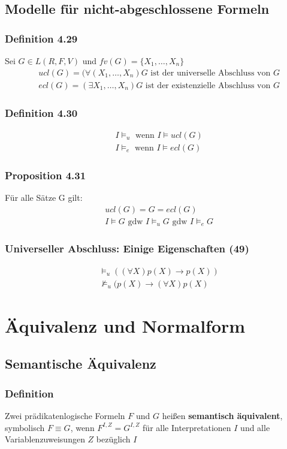 \subsection{Modelle für nicht-abgeschlossene Formeln}
\subsubsection{Definition 4.29}
Sei \(G \in L(R,F,V) \) und \(fv(G) = \{X_{1}, \ldots , X_{n}\}\)
\begin{align*}
& ucl(G) = (\forall (X_{1}, \ldots , X_{n}) G \text{ ist der universelle Abschluss von } G \\
& ecl(G) = (\exists X_{1}, \ldots , X_{n}) G \text{ ist der existenzielle Abschluss von } G
\end{align*}
\subsubsection{Definition 4.30}
\begin{align*}
& I \vDash _{u} \text{ wenn } I \vDash ucl(G) \\
& I \vDash _{e} \text{ wenn } I \vDash ecl(G) 
\end{align*}
\subsubsection{Proposition 4.31}
Für alle Sätze G gilt:
\begin{align*}
& ucl(G) = G = ecl (G) \\
& I \vDash G \text{ gdw } I \vDash _{u} G \text{ gdw } I \vDash_{e} G
\end{align*}
\subsubsection{Universeller Abschluss: Einige Eigenschaften (49)}
\begin{align*}
&\vDash _{u} ((\forall X)p(X) \to p(X)) \\
&\nvDash _{u} (p(X) \to (\forall X)p(X) 
\end{align*}

\section{Äquivalenz und Normalform}
\subsection{Semantische Äquivalenz}
\subsubsection{Definition}
Zwei prädikatenlogische Formeln \(F\) und \(G\) heißen \textbf{semantisch äquivalent}, symbolisch \(F\equiv G\), wenn \(F^{I,Z} = G^{I,Z}\) für alle Interpretationen \(I\) und alle Variablenzuweisungen \(Z\) bezüglich \(I\)
